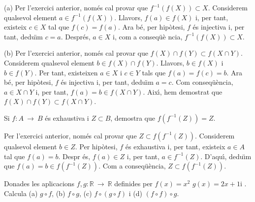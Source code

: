\begin{solucio}
(a) Per l'exercici anterior, nom\'{e}s cal provar que $f^{-1}\left(
f(X)\right) \subset X$. Considerem qualsevol element $a\in f^{-1}\left(
f(X)\right) $. Llavors, $f(a)\in f(X)$ i, per tant, existeix $c\in X$ tal
que $f(c)=f(a)$. Ara b\'{e}, per hip\`{o}tesi, $f$ \'{e}s injectiva i, per
tant, dedu\"{\i}m $c=a$. Despr\'{e}s, $a\in X$ i, com a conseq\"{u}\`{e}%
ncia, $f^{-1}\left( f(X)\right) \subset X$.

(b) Per l'exercici anterior, nom\'{e}s cal provar que $f(X)\cap f(Y)\subset
f(X\cap Y)$. Considerem qualsevol element $b\in f(X)\cap f(Y)$. Llavors, $%
b\in f(X)$ i $b\in f(Y)$. Per tant, existeixen $a\in X$ i $c\in Y$ tals que $%
f(a)=f(c)=b$. Ara b\'{e}, per hip\`{o}tesi, $f$ \'{e}s injectiva i, per
tant, dedu\"{\i}m $a=c$. Com conseq\"{u}\`{e}ncia, $a\in X\cap Y$ i, per
tant, $f(a)=b\in f(X\cap Y)$. Aix\'{\i}, hem demostrat que $f(X)\cap
f(Y)\subset f(X\cap Y)$.
\end{solucio}

\begin{exercici}
Si $f:A~\longrightarrow ~B$ \'{e}s exhaustiva i $Z\subset B$, demostra que $%
f\left( f^{-1}(Z)\right) =Z$.
\end{exercici}

\begin{solucio}
Per l'exercici anterior, nom\'{e}s cal provar que $Z\subset f\left(
f^{-1}(Z)\right) $. Considerem qualsevol element $b\in Z$. Per hip\`{o}tesi,
$f$ \'{e}s exhaustiva i, per tant, existeix $a\in A$ tal que $f(a)=b$. Despr%
\'{e}s, $f(a)\in Z$ i, per tant, $a\in f^{-1}(Z)$. D'aqu\'{\i}, dedu\"{\i}m
que $f(a)=b\in f\left( f^{-1}(Z)\right) $. Com a conseq\"{u}\`{e}ncia, $%
Z\subset f\left( f^{-1}(Z)\right) $.
\end{solucio}

\begin{exercici}
Donades les aplicacions $f,g:\mathbb{R}~\longrightarrow ~\mathbb{R}$
definides per $f(x)=x^{2}$ $g(x)=2x+1$i . Calcula (a) $g\circ f$, (b) $%
f\circ g$, (c) $f\circ (g\circ f)$ i (d) $(f\circ f)\circ g$.
\end{exercici}

